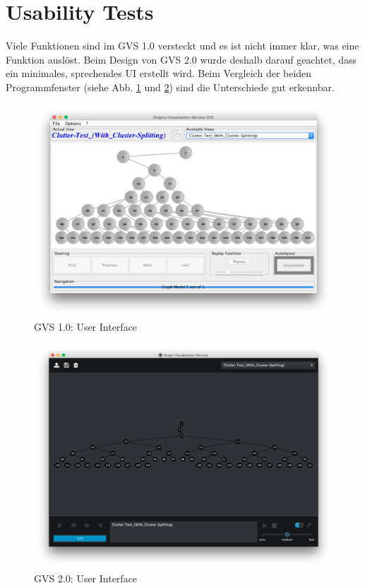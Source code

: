 \documentclass[11pt,a4paper,english,oneside]{book}
\numberwithin{equation}{chapter}
\begin{document}
	\section{Usability Tests}
	Viele Funktionen sind im GVS 1.0 versteckt und es ist nicht immer klar, was eine Funktion auslöst. Beim Design von GVS 2.0 wurde deshalb darauf geachtet, dass ein minimales, sprechendes UI erstellt wird. Beim Vergleich der beiden Programmfenster (siehe Abb. \ref{fig:gvs-1} und \ref{fig:gvs-2}) sind die Unterschiede gut erkennbar. 
	
	\begin{figure}[h!]
		\centering
		\includegraphics[width=0.6\linewidth]{assets/images/gvs-1}
		\caption{GVS 1.0: User Interface}
		\label{fig:gvs-1}
	\end{figure}

	\begin{figure}[h!]
		\centering
		\includegraphics[width=0.6\linewidth]{assets/images/gvs-2}
		\caption{GVS 2.0: User Interface}
		\label{fig:gvs-2}
	\end{figure}
	
\end{document}
